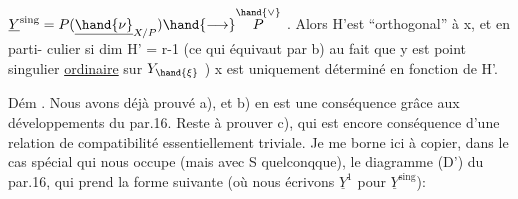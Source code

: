 
$\underline{Y}^{\mathrm{sing}} = P(\underline{\hand{\nu}}_{X/P}) \hand{\longrightarrow} \overset{\hand{\vee}}{P}$ . Alors H'est ``orthogonal'' à x, et en parti-%
culier si dim H' = r-1 (ce qui équivaut par b) au fait que 
y est point  singulier \uline{ordinaire} sur $Y_{\hand{\xi}}$ ) x est uniquement déterminé
en fonction de H'.

Dém . Nous avons déjà prouvé a), et b) en est une conséquence
grâce aux développements du par.16. Reste à prouver c), qui est
encore conséquence d'une relation de compatibilité essentiellement
triviale. Je me borne ici à copier, dans le cas spécial qui nous
occupe (mais avec S quelconqque), le diagramme (D') du par.16, qui
prend la forme suivante (où nous écrivons $\underline{Y}^1$ pour $\underline{Y}^{\mathrm{sing}}$):


